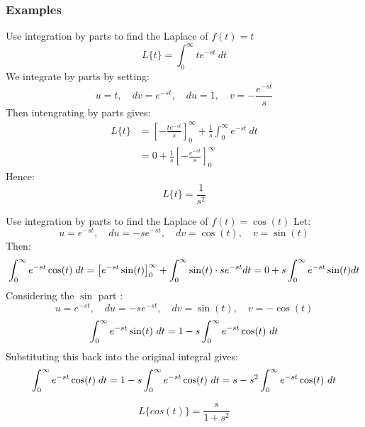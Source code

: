 \documentclass[a4paper, 10pt]{article}
\begin{document}
\subsubsection{Examples}

\begin{examplebox}{Use integration by parts to find the Laplace of $f(t) = t$}{}
  $$L\{t\} = \int_0^\infty te^{-st} \ dt$$
  We integrate by parts by setting:
  $$u = t, \quad dv = e^{-st}, \quad du = 1, \quad v = -\frac{e^{-st}}{s}$$
  Then intengrating by parts gives:
  \begin{align*}
    L\{t\} & = \left [ -\frac{te^{-st}}{s} \right ]_0^\infty + \frac{1}{s}\int_0^\infty e^{-st} \ dt \\
           & = 0 + \frac{1}{s}\left [ -\frac{e^{-st}}{s} \right ]_0^\infty
  \end{align*}
  Hence:
  $$L\{t\} = \frac{1}{s^2}$$
\end{examplebox}

\begin{examplebox}{Use integration by parts to find the Laplace of $f(t) = \cos(t)$}{}
  Let:
  $$u = e^{-st}, \quad du = -se^{-st}, \quad dv = \cos(t), \quad v = \sin(t)$$
  Then:
  $$
    \int_0^{\infty} e^{-st} \cos(t)\; dt = \left[ e^{-st} \sin(t) \right]_0^\infty + \int_0^{\infty} \sin(t)\cdot se^{-st} dt = 0 + s\int_0^{\infty} e^{-st} \sin(t) dt
  $$
  Considering the $\sin$ part :
  $$u = e^{-st}, \quad du = -se^{-st}, \quad dv = \sin(t), \quad v = -\cos(t)$$
  $$\int_0^{\infty} e^{-st} \sin(t)\ dt = 1 - s \int_0^{\infty} e^{-st} \cos(t) \ dt$$
  Substituting this back into the original integral gives:
  $$
    \intinf e^{-st} \cos(t)\; dt = 1 - s\intinf e^{-st} \cos(t)\ dt = s - s^2\intinf e^{-st} \cos(t)\ dt \\
  $$

  $$L\{cos(t)\}= \dfrac{s}{1+s^2}$$
\end{examplebox}
\end{document}
